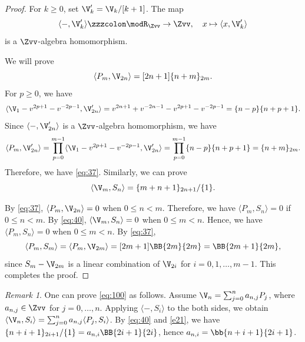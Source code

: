 \documentclass{amsart}
\numberwithin{equation}{section}
\numberwithin{figure}{section}
\theoremstyle{plain}
\theoremstyle{definition}
\theoremstyle{remark}
\newtheorem{remark}[theorem]{Remark}
\begin{document}
\begin{proof}
  For $k\ge 0$, set $\V'_k=\V_k/[k+1]$.  The map
  \begin{equation*}
    \langle -,\V'_k\rangle \zzzcolon \modR _{\Zvv}\rightarrow \Zvv,\quad  x\mapsto \langle x,\V'_k\rangle 
  \end{equation*}
  is a $\Zvv$-algebra homomorphism.

  We will prove
  \begin{equation}
    \label{eq:37} \langle P_m, \V_{2n}\rangle  =[2n+1]\{n+m\}_{2m}.
  \end{equation}
  For $p\ge 0$, we have
  \begin{equation*}
    \langle \V_1-v^{2p+1}-v^{-2p-1},\V'_{2n}\rangle 
    =v^{2n+1}+v^{-2n-1}-v^{2p+1}-v^{-2p-1}=\{n-p\}\{n+p+1\}.
  \end{equation*}
  Since $\langle -,\V'_{2n}\rangle $ is a $\Zvv$-algebra homomorphism, we have
  \begin{equation*}
    \langle P_m,\V'_{2n}\rangle 
    =\prod_{p=0}^{m-1}\langle \V_1 - v^{2p+1}-v^{-2p-1},\V'_{2n}\rangle 
    =\prod_{p=0}^{m-1}\{n-p\}\{n+p+1\}=\{n+m\}_{2m}.
  \end{equation*}
  Therefore, we have \eqref{eq:37}.  Similarly, we can prove
  \begin{equation}
    \label{eq:40} \langle \V_m,S_n\rangle  = \{m+n+1\}_{2n+1}/\{1\}.
  \end{equation}

  By \eqref{eq:37}, $\langle P_m,\V_{2n}\rangle =0$ when $0\le n<m$.  Therefore, we
  have $\langle P_m,S_n\rangle =0$ if $0\le n<m$.  By \eqref{eq:40},
  $\langle \V_m,S_n\rangle =0$ when $0\le m<n$.  Hence, we have $\langle P_m,S_n\rangle =0$ when
  $0\le m<n$.  By \eqref{eq:37},
  \begin{equation*}
    \langle P_m,S_m\rangle =\langle P_m,\V_{2m}\rangle =[2m+1]\BB{2m}{2m}=\BB{2m+1}{2m},
  \end{equation*}
  since $S_m-\V_{2m}$ is a linear combination of $\V_{2i}$ for
  $i=0,1,\ldots,m-1$.  This completes the proof.
\end{proof}

\begin{remark}
  \label{thm:91}
  One can prove \eqref{eq:100} as follows.  Assume
  $\V_n=\sum_{j=0}^na_{n,j}P_j$, where $a_{n,j}\in \Zvv$ for $j=0,\ldots,n$.
  Applying $\langle -,S_i\rangle $ to the both sides, we obtain
  $\langle \V_n,S_i\rangle =\sum_{j=0}^n a_{n,j}\langle P_j,S_i\rangle $.  By \eqref{eq:40}
  and \eqref{e21}, we have
  $\{n+i+1\}_{2i+1}/\{1\}=a_{n,i}\BB{2i+1}{2i}$, hence
  $a_{n,i}=\bb{n+i+1}{2i+1}$.
\end{remark}
\end{document}
